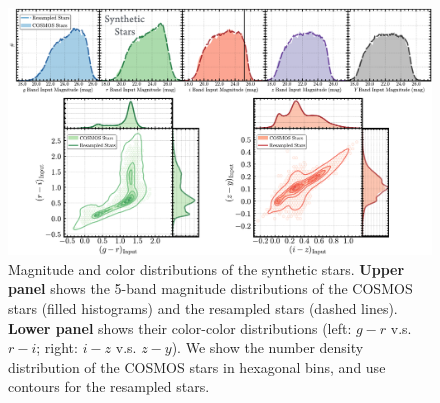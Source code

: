 \documentclass[useamsfonts]{pasj01}
\begin{document}
\begin{figure}
    \begin{center}
        \includegraphics[width=\textwidth]{fig/synpipe_star_sample}
    \end{center}
    \caption{
        Magnitude and color distributions of the synthetic stars.
        \textbf{Upper panel} shows the 5-band magnitude distributions of the COSMOS
        stars (filled histograms) and the resampled stars (dashed lines).
        \textbf{Lower panel} shows their color-color distributions
        (left: $g-r$ v.s. $r-i$; right: $i-z$ v.s. $z-y$).
        We show the number density distribution of the COSMOS stars in hexagonal bins,
        and use contours for the resampled stars.
        }
    \label{fig:star_sample}
\end{figure}
\end{document}
